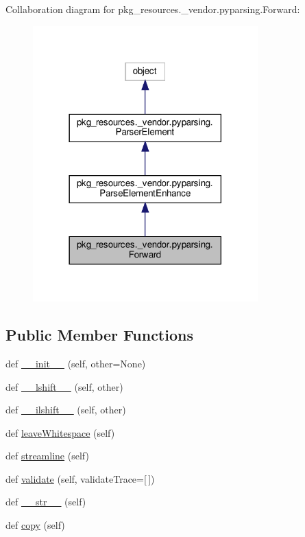 Collaboration diagram for pkg\+\_\+resources.\+\_\+vendor.\+pyparsing.\+Forward\+:
\nopagebreak
\begin{figure}[H]
\begin{center}
\leavevmode
\includegraphics[width=246pt]{classpkg__resources_1_1__vendor_1_1pyparsing_1_1Forward__coll__graph}
\end{center}
\end{figure}
\subsection*{Public Member Functions}
\begin{DoxyCompactItemize}
\item 
def \hyperlink{classpkg__resources_1_1__vendor_1_1pyparsing_1_1Forward_ad0281c3b1f2ecac84f8cc63f6b70865b}{\+\_\+\+\_\+init\+\_\+\+\_\+} (self, other=None)
\item 
def \hyperlink{classpkg__resources_1_1__vendor_1_1pyparsing_1_1Forward_a559826dc3a088ec56c78394ab9b2e861}{\+\_\+\+\_\+lshift\+\_\+\+\_\+} (self, other)
\item 
def \hyperlink{classpkg__resources_1_1__vendor_1_1pyparsing_1_1Forward_a79d63d7b81b18ff5ad5559f8b33e5020}{\+\_\+\+\_\+ilshift\+\_\+\+\_\+} (self, other)
\item 
def \hyperlink{classpkg__resources_1_1__vendor_1_1pyparsing_1_1Forward_a7d8086963ff517abd0fe841f47b7a655}{leave\+Whitespace} (self)
\item 
def \hyperlink{classpkg__resources_1_1__vendor_1_1pyparsing_1_1Forward_ac3e42316a8c2f4c5f4d037de26cfc168}{streamline} (self)
\item 
def \hyperlink{classpkg__resources_1_1__vendor_1_1pyparsing_1_1Forward_a59125ffa3d42492c89e898fc40e3d018}{validate} (self, validate\+Trace=\mbox{[}$\,$\mbox{]})
\item 
def \hyperlink{classpkg__resources_1_1__vendor_1_1pyparsing_1_1Forward_a1e468226791e7f5d4db8044f8625b470}{\+\_\+\+\_\+str\+\_\+\+\_\+} (self)
\item 
def \hyperlink{classpkg__resources_1_1__vendor_1_1pyparsing_1_1Forward_a6fbcb53f442c389dce526b5e503c48a6}{copy} (self)
\end{DoxyCompactItemize}
